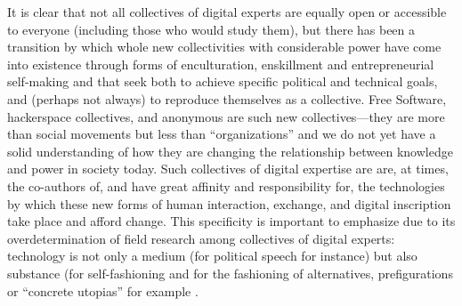 \documentclass[10pt,letter,oneside]{scrartcl}
\begin{document}
It is clear that not all collectives of digital experts are equally
open or accessible to everyone (including those who would study them),
but there has been a transition by which whole new collectivities with
considerable power have come into existence through forms of
enculturation, enskillment and entrepreneurial self-making and that
seek both to achieve specific political and technical goals, and
(perhaps not always) to reproduce themselves as a collective.  Free
Software, hackerspace collectives, and anonymous are such new
collectives---they are more than social movements but less than
``organizations'' and we do not yet have a solid understanding of how
they are changing the relationship between knowledge and power in
society today. Such collectives of digital expertise are are, at
times, the co-authors of, and have great affinity and responsibility
for, the technologies by which these new forms of human interaction,
exchange, and digital inscription take place and afford change. This
specificity is important to emphasize due to its overdetermination of
field research among collectives of digital experts: technology is not only a
medium (for political speech for instance) but also substance (for
self-fashioning and for the fashioning of alternatives, prefigurations
\cite{Leach2013} or ``concrete utopias'' for example \cite{Bloch1986,Broca2012}. 



\end{document}
